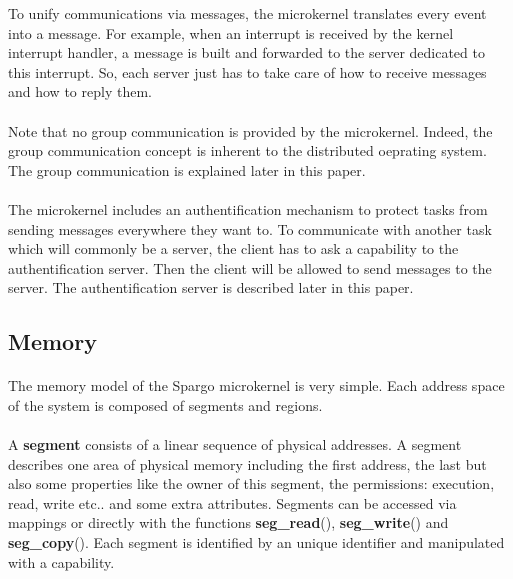 \documentclass[10pt,a4wide]{article}
\begin{document}
\begin{multicols}{2}
To unify communications via messages, the microkernel translates every event
into a message. For example, when an interrupt is received by the kernel
interrupt handler, a message is built and forwarded to the server dedicated
to this interrupt. So, each server just has to take care of how to receive
messages and how to reply them.

\paragraph{}

Note that no group communication is provided by the microkernel. Indeed, the
group communication concept is inherent to the distributed oeprating system.
The group communication is explained later in this paper.

\paragraph{}

The microkernel includes an authentification mechanism to protect tasks from
sending messages everywhere they want to. To communicate with another task
which will commonly be a server, the client has to ask a capability to
the authentification server. Then the client will be allowed to send messages
to the server. The authentification server is described later in this paper.

\subsection{Memory}

\paragraph{}

The memory model of the Spargo microkernel is very simple. Each address space
of the system is composed of segments and regions.

\paragraph{}

A \textbf{segment} consists of a linear sequence of physical addresses.
A segment describes one area of physical memory including the
first address, the last but also some properties like the owner of this
segment, the permissions: execution, read, write etc.. and some
extra attributes. Segments can be accessed via mappings or directly with
the functions \textbf{seg\_read}(), \textbf{seg\_write}() and
\textbf{seg\_copy}(). Each segment is identified by an unique identifier
and manipulated with a capability.


\end{multicols}
\end{document}
